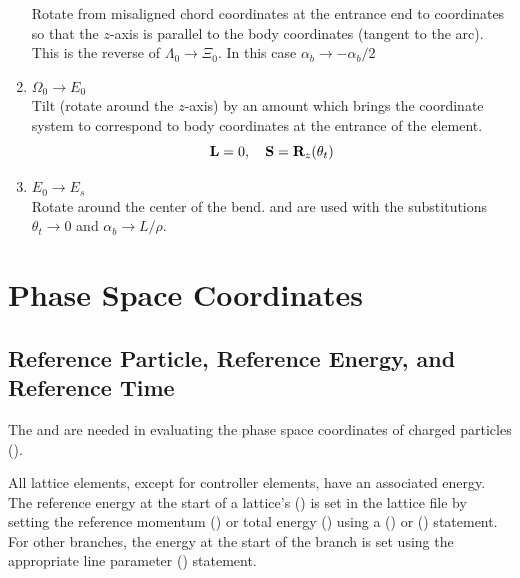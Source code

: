 \begin{enumerate}
Rotate from misaligned chord coordinates at the entrance end to coordinates 
so that the $z$-axis is parallel to the body coordinates (tangent to the arc). 
This is the reverse of $\Lambda_0 \longrightarrow \Xi_0$. In this case $\alpha_b \rightarrow -\alpha_b/2$
%
\item $\Omega_{0} \longrightarrow E_0$ \\
Tilt (rotate around the $z$-axis) by an amount  which brings the coordinate system to
correspond to body coordinates at the entrance of the element.
\begin{equation}
  {\bf L} = 0, \quad
  {\bf S} = {\bf R}_{z}(\theta_t)
  \label{l0sr}
\end{equation}
%
\item $E_0 \longrightarrow E_s$ \\
Rotate around the
center of the bend.  and  are used with the substitutions
$\theta_t \rightarrow 0$ and $\alpha_b \rightarrow L/\rho$.
%
\end{enumerate}

\section{Phase Space Coordinates}
\label{s:phase.coords}

\subsection{Reference Particle, Reference Energy, and Reference Time}
\label{s:ref.energy}

The  and  are needed in evaluating the phase space
coordinates of charged particles ().

All lattice elements, except for controller elements, have an associated 
energy.  The reference energy at the start of a lattice's  () is
set in the lattice file by setting the reference momentum () or total energy ()
using a  () or  () statement. For other
branches, the energy at the start of the branch is set using the appropriate line parameter
() statement.

